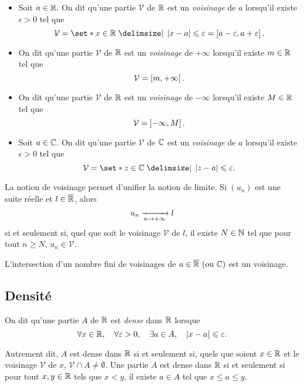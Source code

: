 \documentclass{magnolia}
\begin{document}
\begin{definition}[utile=-3]
\begin{itemize}
\item Soit $a\in\mathbb{R}$. On dit qu'une partie $\mathcal{V}$ de $\mathbb{R}$ est un \emph{voisinage} de $a$ lorsqu'il existe $\epsilon>0$ tel que 
  \[\mathcal{V}=\enstq{x\in\R}{\abs{x-a}\leq\epsilon} 
    =\interf{a-\epsilon}{a+\epsilon}.\]
\item On dit qu'une partie $\mathcal{V}$ de $\mathbb{R}$ est un \emph{voisinage} de $+\infty$
  lorsqu'il existe $m\in\mathbb{R}$ tel que
  \[\mathcal{V}=\left[m,+\infty\right[.\]
\item On dit qu'une partie $\mathcal{V}$ de $\mathbb{R}$ est un \emph{voisinage} de $-\infty$
  lorsqu'il existe $M\in\mathbb{R}$ tel que
  \[\mathcal{V}=\left]-\infty,M\right].\]
\item Soit $a\in\mathbb{C}$. On dit qu'une partie $\mathcal{V}$ de $\mathbb{C}$ est un \emph{voisinage} de $a$ lorsqu'il existe $\epsilon>0$ tel que
  \[\mathcal{V}=\enstq{z\in\C}{\abs{z-a}\leq\epsilon}.\]
\end{itemize}
\end{definition}

\begin{remarqueUnique}
\remarque La notion de voisinage permet d'unifier la notion de limite. Si $(u_n)$ est
  une suite réelle et $l\in\overline{\mathbb{R}}$, alors
  \[u_n\xrightarrow[n\rightarrow +\infty]{}l\]
  si et seulement si, quel que soit le voisinage $\mathcal{V}$ de $l$, il
  existe $N\in\mathbb{N}$ tel que pour tout $n\geq N$, $u_n\in\mathcal{V}$.
\end{remarqueUnique}

\begin{proposition}
L'intersection d'un nombre fini de voisinages de $a\in\text{$\overline{\mathbb{R}}$ (ou $\mathbb{C}$)}$ est un voisinage.
\end{proposition}

\subsection{Densité}


\begin{definition}[utile=-3]
On dit qu'une partie $A$  de $\mathbb{R}$ est \emph{dense} dans $\mathbb{R}$ lorsque
  \[\forall x\in\mathbb{R} ,\quad \forall \varepsilon>0 ,\quad \exists a\in A ,\quad
    \left|x-a\right|\leqslant\varepsilon.\]
  \end{definition}
  
  \begin{remarques}
  \remarque Autrement dit, $A$ est dense dans $\mathbb{R}$ si et seulement si, quels que soient
    $x\in\mathbb{R}$ et le voisinage $\mathcal{V}$ de $x$,
    $\mathcal{V}\cap A\neq\emptyset$.
  \remarque Une partie $A$ est dense dans $\mathbb{R}$ si et seulement si pour tout
    $x,y\in\mathbb{R}$ tels que $x<y$, il existe $a\in A$ tel que $x\leq a\leq y$.
  \end{remarques}
  
\end{document}
